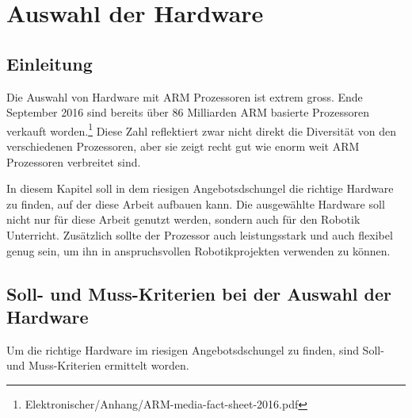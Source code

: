 \chapter{Auswahl der Hardware}

\section{Einleitung}
Die Auswahl von Hardware mit ARM Prozessoren ist extrem gross.
Ende September 2016 sind bereits über 86 Milliarden ARM basierte Prozessoren verkauft worden.\footnote{Elektronischer/Anhang/ARM-media-fact-sheet-2016.pdf}
Diese Zahl reflektiert zwar nicht direkt die Diversität von den verschiedenen Prozessoren, aber sie zeigt recht gut wie enorm weit ARM Prozessoren verbreitet sind.

In diesem Kapitel soll in dem riesigen Angebotsdschungel die richtige Hardware zu finden, auf der diese Arbeit aufbauen kann.
Die ausgewählte Hardware soll nicht nur für diese Arbeit genutzt werden, sondern auch für den Robotik Unterricht.
Zusätzlich sollte der Prozessor auch leistungsstark und auch flexibel genug sein, um ihn in anspruchsvollen Robotikprojekten verwenden zu können.


\section{Soll- und Muss-Kriterien bei der Auswahl der Hardware}
Um die richtige Hardware im riesigen Angebotsdschungel zu finden, sind Soll- und Muss-Kriterien ermittelt worden.

